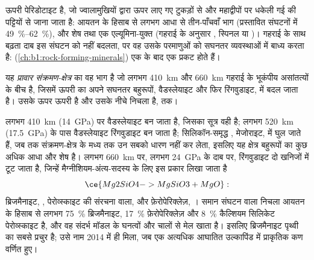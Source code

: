 ऊपरी  पेरिडोटाइट है, जो ज्वालामुखियों द्वारा ऊपर लाए गए टुकड़ों से और महाद्वीपों पर धकेली गई  की पट्टियों से जाना जाता है: आयतन के हिसाब से लगभग आधा से तीन-पाँचवाँ भाग  (प्रस्तावित संघटनों में \qtyrange{49}{62}{\percent}), और शेष  तथा एक एल्यूमिना-युक्त  (गहराई के अनुसार , स्पिनल या )। गहराई के साथ बढ़ता दाब इस संघटन को नहीं बदलता, पर वह उसके परमाणुओं को सघनतर व्यवस्थाओं में बाध्य करता है:  (\cref{ch:b1:rock-forming-minerals}) एक के बाद एक प्रकट होते हैं।

\begin{definition}[प्रावार का संक्रमण-क्षेत्र]\label{def:b1:layered-earth:transition-zone}
यह \emph{प्रावार संक्रमण-क्षेत्र}  का वह भाग है जो लगभग \qty{410}{km} और \qty{660}{km} गहराई के भूकंपीय असांतत्यों के बीच है, जिसमें ऊपरी  का  अपने सघनतर बहुरूपों, वैडस्लेयाइट और फिर रिंगवुडाइट, में बदल जाता है। उसके ऊपर ऊपरी  है और उसके नीचे निचला  है,  तक।
\end{definition}

लगभग \qty{410}{km} (\qty{14}{GPa}) पर   वैडस्लेयाइट बन जाता है, जिसका सूत्र वही है; लगभग \qty{520}{km} (\qty{17.5}{GPa}) के पास वैडस्लेयाइट रिंगवुडाइट बन जाता है;  सिलिकॉन-समृद्ध , मेजोराइट, में घुल जाते हैं, जब तक संक्रमण-क्षेत्र के मध्य तक  उन सबको धारण नहीं कर लेता, इसलिए यह क्षेत्र  बहुरूपों का कुछ अधिक आधा और शेष  है। लगभग \qty{660}{km} पर, लगभग \qty{24}{GPa} के दाब पर, रिंगवुडाइट दो खनिजों में टूट जाता है, जिन्हें मैग्नीशियम-अंत्य-सदस्य के लिए इस प्रकार लिखा जाता है
\[
  \ce{Mg2SiO4 -> MgSiO3 + MgO}:
\]
ब्रिजमैनाइट, , पेरोव्स्काइट की संरचना वाला, और फ़ेरोपेरिक्लेज़, । समान संघटन वाला निचला  आयतन के हिसाब से लगभग \qty{75}{\percent} ब्रिजमैनाइट, \qty{17}{\percent} फ़ेरोपेरिक्लेज़ और \qty{8}{\percent} कैल्शियम सिलिकेट पेरोव्स्काइट है, और वह संदर्भ मॉडल के घनत्वों और चालों से मेल खाता है। इसलिए ब्रिजमैनाइट पृथ्वी का सबसे प्रचुर  है; उसे नाम 2014 में ही मिला, जब एक अत्यधिक आघातित उल्कापिंड में प्राकृतिक कण वर्णित हुए।


